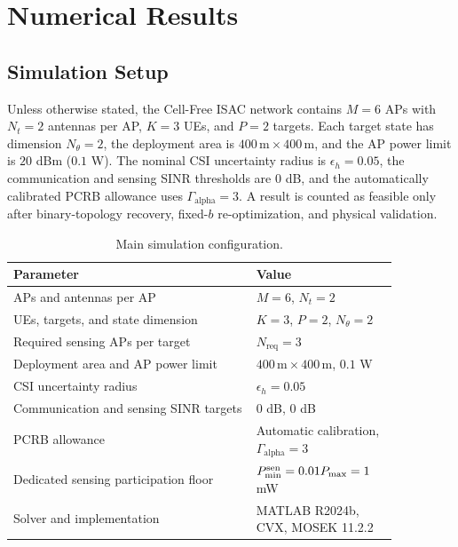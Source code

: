 \section{Numerical Results}\label{sec:numerical}

\subsection{Simulation Setup}
Unless otherwise stated, the Cell-Free ISAC network contains $M=6$ APs with
$N_t=2$ antennas per AP, $K=3$ UEs, and $P=2$ targets. Each target state has
dimension $N_\theta=2$, the deployment area is $400\,\mathrm{m}\times
400\,\mathrm{m}$, and the AP power limit is $20$ dBm ($0.1$ W). The nominal
CSI uncertainty radius is $\epsilon_h=0.05$, the communication and sensing
SINR thresholds are $0$ dB, and the automatically calibrated PCRB allowance
uses $\Gamma_{\mathrm{alpha}}=3$. A result is counted as feasible only after
binary-topology recovery, fixed-$b$ re-optimization, and physical validation.

\begin{table}[htbp]
\centering
\caption{Main simulation configuration.}
\label{tab:simulation-setup}
\begin{tabular}{p{0.56\linewidth}p{0.30\linewidth}}
\toprule
Parameter & Value\\
\midrule
APs and antennas per AP & $M=6$, $N_t=2$\\
UEs, targets, and state dimension & $K=3$, $P=2$, $N_\theta=2$\\
Required sensing APs per target & $N_{\mathrm{req}}=3$\\
Deployment area and AP power limit & $400\,\mathrm{m}\times400\,\mathrm{m}$, $0.1$ W\\
CSI uncertainty radius & $\epsilon_h=0.05$\\
Communication and sensing SINR targets & $0$ dB, $0$ dB\\
PCRB allowance & Automatic calibration, $\Gamma_{\mathrm{alpha}}=3$\\
Dedicated sensing participation floor & $P_{\min}^{\rm sen}=0.01P_{\max}=1$ mW\\
Solver and implementation & MATLAB R2024b, CVX, MOSEK 11.2.2\\
\bottomrule
\end{tabular}
\end{table}

